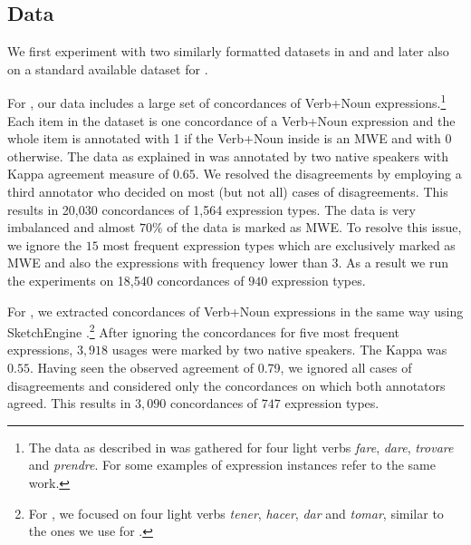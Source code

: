 \documentclass[output=paper
,modfonts
,nonflat]{langsci/langscibook}
\begin{document}
\subsection{Data}

We first experiment with two similarly formatted datasets in  and  and later also on a %
standard available dataset for .

For , our data includes a large set of concordances of Verb+Noun expressions.\footnote{The data as described in \cite{Taslimipoor2016} was gathered for four light verbs \textit{fare}, \textit{dare}, \textit{trovare} and \textit{prendre}. For some examples of expression instances refer to the same work.} %
Each item in the dataset is one concordance of a Verb+Noun expression and the whole item is annotated with 1 if the Verb+Noun inside is an MWE and with 0 otherwise.
The data as explained in \cite{Taslimipoor2016} was annotated by two native speakers with Kappa agreement measure of $0.65$. We resolved the disagreements by employing a third annotator who decided on most (but not all) cases of disagreements. This results in 20,030 concordances of 1,564 expression types. The  data is very imbalanced and almost $70\%$ of the data is marked as MWE. To resolve this issue, we ignore the $15$ most frequent expression types which are exclusively marked as MWE and also the expressions with frequency lower than $3$. As a result we run the experiments on 18,540 concordances of $940$ expression types.

For , we extracted concordances of Verb+Noun expressions in the same way using SketchEngine \citep{kilgarriff2004}.\footnote{For , we focused on four light verbs \textit{tener}, \textit{hacer}, \textit{dar} and \textit{tomar}, similar to the ones we use for .} After ignoring the concordances for five most frequent expressions, $3,918$ usages were marked by two native speakers. The Kappa  was $0.55$. Having seen the observed agreement of 0.79, we ignored all cases of disagreements and considered only the concordances on which both annotators agreed. 
This results in $3,090$ concordances of $747$ expression types.  
\end{document}
